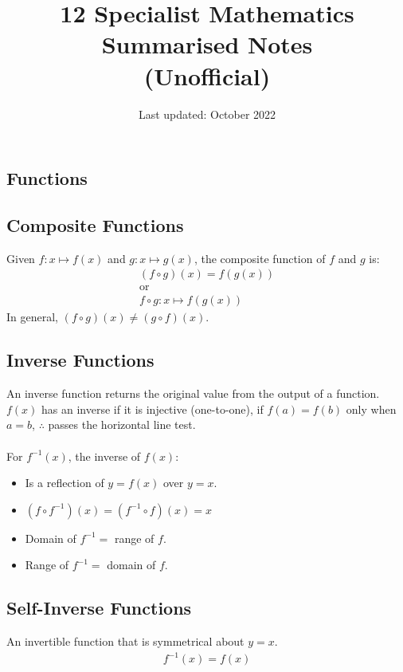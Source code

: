 \documentclass[10pt, a4paper, titlepage]{article}
\begin{document}
\title{12 Specialist Mathematics Summarised Notes \\ (Unofficial)}
\author{}
\date{Last updated: October 2022}
\maketitle

\begin{multicols*}{3}

\section{Functions}
	\subsection{Composite Functions}
	Given $f:x\mapsto f(x)$ and $g:x\mapsto g(x)$, the composite function of $f$ and $g$ is:
	\begin{gather}
		(f\circ g)(x)=f(g(x))\\
		\text{or}\\
		f\circ g:x\mapsto f(g(x))
	\end{gather}
	In general, $(f\circ g)(x)\neq (g\circ f)(x)$.

	\dotfill
	\subsection{Inverse Functions}
	An inverse function returns the original value from the output of a function.\\
	$f(x)$ has an inverse if it is injective (one-to-one), if $f(a)=f(b)$ only when $a=b$, $\therefore$ passes the horizontal line test.\\\\
	For $f^{-1}(x)$, the inverse of $f(x)$:
	\begin{itemize}
		\item Is a reflection of $y=f(x)$ over $y=x$.
		\item $(f\circ f^{-1})(x)=(f^{-1}\circ f)(x)=x$
		\item Domain of $f^{-1}=$ range of $f$.
		\item Range of $f^{-1}=$ domain of $f$.
	\end{itemize}

	\dotfill
	\subsection{Self-Inverse Functions}
	An invertible function that is symmetrical about $y=x$.
	\begin{align}
		f^{-1}(x)=f(x)
	\end{align}


\end{multicols*}
\end{document}
